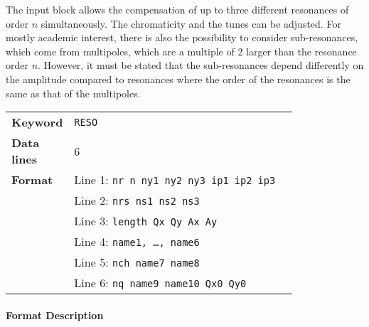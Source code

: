 The input block allows the compensation of up to three different resonances of order $n$ simultaneously.
The chromaticity and the tunes can be adjusted.
For mostly academic interest, there is also the possibility to consider sub-resonances, which come from multipoles, which are a multiple of 2 larger than the resonance order $n$.
However, it must be stated that the sub-resonances depend differently on the amplitude compared to resonances where the order of the resonances is the same as that of the multipoles.

\bigskip
\begin{tabular}{@{}lp{0.8\linewidth}}
    \textbf{Keyword}    & \texttt{RESO} \\
    \textbf{Data lines} & 6 \\
    \textbf{Format}     & Line 1: \texttt{nr n ny1 ny2 ny3 ip1 ip2 ip3} \\
                        & Line 2: \texttt{nrs ns1 ns2 ns3} \\
                        & Line 3: \texttt{length Qx Qy Ax Ay} \\
                        & Line 4: \texttt{name1, \dots, name6} \\
                        & Line 5: \texttt{nch name7 name8} \\
                        & Line 6: \texttt{nq name9 name10 Qx0 Qy0}
\end{tabular}

\paragraph{Format Description}~

